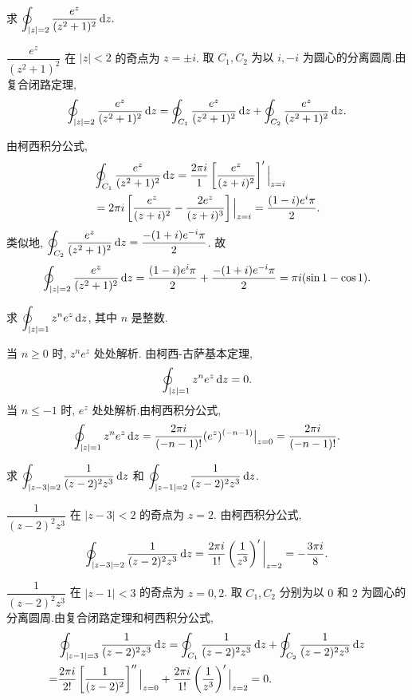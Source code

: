 \begin{example}
	求 $\displaystyle\oint_{|z|=2}\frac{e^z}{(z^2+1)^2}\,\mathrm{d} z.$
\end{example}

\begin{solution}
	$\dfrac{e^z}{(z^2+1)^2}$ 在 $|z|<2$ 的奇点为 $z=\pm i$.
	{取 $C_1,C_2$ 为以 $i,-i$ 为圆心的分离圆周.由复合闭路定理,
		\[\oint_{|z|=2}\frac{e^z}{(z^2+1)^2}\,\mathrm{d} z
		=\oint_{C_1}\frac{e^z}{(z^2+1)^2}\,\mathrm{d} z
		+\oint_{C_2}\frac{e^z}{(z^2+1)^2}\,\mathrm{d} z.\]}

	由柯西积分公式,
	\begin{align*}
		&\oint_{C_1}\frac{e^z}{(z^2+1)^2}\,\mathrm{d} z
		=\frac{2\pi i}{1}\left[\frac{e^z}{(z+i)^2}\right]'\Big|_{z=i}\\
		&=2\pi i\left[\frac{e^z}{(z+i)^2}-\frac{2e^z}{(z+i)^3}\right]\Big|_{z=i}
		=\frac{(1-i)e^i\pi}2.
	\end{align*}
	类似地, $\displaystyle\oint_{C_2}\frac{e^z}{(z^2+1)^2}\,\mathrm{d} z=\frac{-(1+i)e^{-i}\pi}2$.
	故
		\[\oint_{|z|=2}\frac{e^z}{(z^2+1)^2}\,\mathrm{d} z
		=\frac{(1-i)e^i\pi}2+\frac{-(1+i)e^{-i}\pi}2
		=\pi i(\sin1-\cos1).\]
\end{solution}

\begin{example}
	求 $\displaystyle\oint_{|z|=1}z^ne^z\,\mathrm{d} z$, 其中 $n$ 是整数.
\end{example}

\begin{solution}
	当 $n\ge 0$ 时, $z^ne^z$ 处处解析.
	由柯西-古萨基本定理, 
	\[
		\oint_{|z|=1}z^ne^z\,\mathrm{d} z=0.
	\]
	当 $n\le-1$ 时, $e^z$ 处处解析.由柯西积分公式,
	\[
		 \oint_{|z|=1}z^ne^z\,\mathrm{d} z
		=\frac{2\pi i}{(-n-1)!}(e^z)^{(-n-1)}\big|_{z=0}
		=\frac{2\pi i}{(-n-1)!}.
	\]
\end{solution}

\begin{example}
	求 $\displaystyle\oint_{|z-3|=2}\frac1{(z-2)^2z^3}\,\mathrm{d} z$ 和 $\displaystyle\oint_{|z-1|=2}\frac1{(z-2)^2z^3}\,\mathrm{d} z$.
\end{example}

\begin{solution}
	 $\dfrac1{(z-2)^2z^3}$ 在 $|z-3|<2$ 的奇点为 $z=2$.
	{由柯西积分公式,
		\[\oint_{|z-3|=2}\frac1{(z-2)^2z^3}\,\mathrm{d} z
		=\frac{2\pi i}{1!}\left(\frac1{z^3}\right)'\bigg|_{z=2}
		=-\frac{3\pi i}8.\]}

	 $\dfrac1{(z-2)^2z^3}$ 在 $|z-1|<3$ 的奇点为 $z=0,2$.
	取 $C_1,C_2$ 分别为以 $0$ 和 $2$ 为圆心的分离圆周.由复合闭路定理和柯西积分公式,
	\begin{align*}
		 &\oint_{|z-1|=3}\frac1{(z-2)^2z^3}\,\mathrm{d} z=\oint_{C_1}\frac1{(z-2)^2z^3}\,\mathrm{d} z+\oint_{C_2}\frac1{(z-2)^2z^3}\,\mathrm{d} z\\
		=&\frac{2\pi i}{2!}\left[\frac1{(z-2)^2}\right]''\Big|_{z=0}+\frac{2\pi i}{1!}\left(\frac1{z^3}\right)'\Big|_{z=2}=0.
		\end{align*}
\end{solution}

